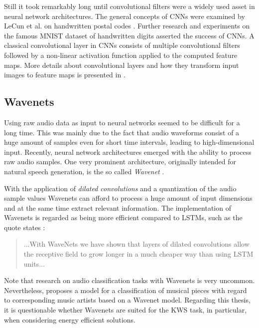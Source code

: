 Still it took remarkably long until convolutional filters were a widely used asset in neural network architectures.
The general concepts of CNNs were examined by LeCun et al. on handwritten postal codes \cite{LeCun1989_Generalization}.
Further research and experiments on the famous MNIST dataset of handwritten digits \cite{LeCun1998} asserted the success of CNNs.
A classical convolutional layer in CNNs consists of multiple convolutional filters followed by a non-linear activation function applied to the computed feature maps.
More details about convolutional layers and how they transform input images to feature maps is presented in .



\subsection{Wavenets}\label{sec:prev_nn_wavenet}
Using raw audio data as input to neural networks seemed to be difficult for a long time.
This was mainly due to the fact that audio waveforms consist of a huge amount of samples even for short time intervals, leading to high-dimensional input.
Recently, neural network architectures emerged with the ability to process raw audio samples.
One very prominent architecture, originally intended for natural speech generation, is the so called \emph{Wavenet} \cite{Oord2016}.

With the application of \emph{dilated convolutions} and a quantization of the audio sample values Wavenets can afford to process a huge amount of input dimensions and at the same time extract relevant information.
The implementation of Wavenets is regarded as being more efficient compared to LSTMs, such as the quote states \cite{Oord2016}:
\begin{quote}
  ...With WaveNets we have shown that layers of dilated convolutions allow the receptive field to grow longer in a much cheaper way than using LSTM units...
\end{quote}
Note that research on audio classification tasks with Wavenets is very uncommon.
Nevertheless, \cite{Zhang2020} proposes a model for a classification of musical pieces with regard to corresponding music artists based on a Wavenet model.
Regarding this thesis, it is questionable whether Wavenets are suited for the KWS task, in particular, when considering energy efficient solutions.



